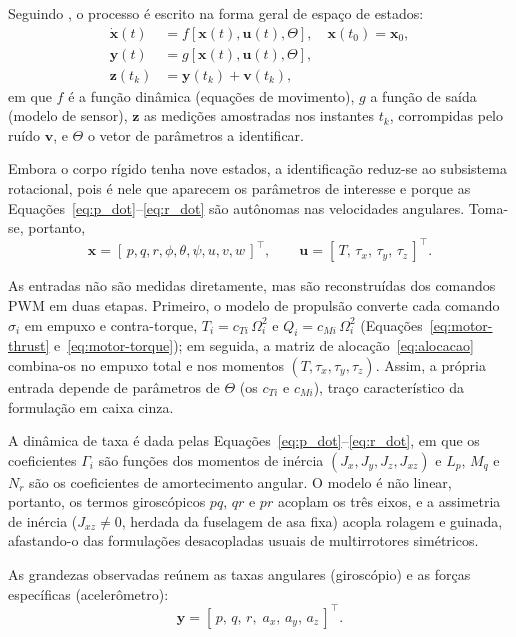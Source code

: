 Seguindo \textcite{Jategaonkar2015}, o processo é escrito na forma geral de espaço de estados:
\begin{align}
\dot{\mathbf{x}}(t) &= f[\mathbf{x}(t),\mathbf{u}(t),\Theta], \quad \mathbf{x}(t_0)=\mathbf{x}_0, \label{eq:model-fx}\\
\mathbf{y}(t) &= g[\mathbf{x}(t),\mathbf{u}(t),\Theta], \label{eq:model-gy}\\
\mathbf{z}(t_k) &= \mathbf{y}(t_k) + \mathbf{v}(t_k), \label{eq:model-z}
\end{align}
em que $f$ é a função dinâmica (equações de movimento), $g$ a função de saída (modelo de sensor), $\mathbf{z}$ as medições amostradas nos instantes $t_k$, corrompidas pelo ruído $\mathbf{v}$, e $\Theta$ o vetor de parâmetros a identificar.

Embora o corpo rígido tenha nove estados, a identificação reduz-se ao subsistema rotacional, pois é nele que aparecem os parâmetros de interesse e porque as Equações~\eqref{eq:p_dot}--\eqref{eq:r_dot} são autônomas nas velocidades angulares. Toma-se, portanto,
\begin{equation}
\mathbf{x}=[\,p,q,r,\phi,\theta,\psi,u,v,w\,]^{\top}, \qquad \mathbf{u}=[\,T,\,\tau_x,\,\tau_y,\,\tau_z\,]^{\top}.
\label{eq:model-xu}
\end{equation}

As entradas não são medidas diretamente, mas são reconstruídas dos comandos PWM em duas etapas. Primeiro, o modelo de propulsão converte cada comando $\sigma_i$ em empuxo e contra-torque, ${T_i=c_{Ti}\,\Omega_i^{2}}$ e ${Q_i=c_{Mi}\,\Omega_i^{2}}$ (Equações~\eqref{eq:motor-thrust} e~\eqref{eq:motor-torque}); em seguida, a matriz de alocação~\eqref{eq:alocacao} combina-os no empuxo total e nos momentos $(T,\tau_x,\tau_y,\tau_z)$. Assim, a própria entrada depende de parâmetros de $\Theta$ (os $c_{Ti}$ e $c_{Mi}$), traço característico da formulação em caixa cinza.

A dinâmica de taxa é dada pelas Equações~\eqref{eq:p_dot}--\eqref{eq:r_dot}, em que os coeficientes $\Gamma_i$ são funções dos momentos de inércia $(J_x,J_y,J_z,J_{xz})$ e $L_p$, $M_q$ e $N_r$ são os coeficientes de amortecimento angular. O modelo é não linear, portanto, os termos giroscópicos $pq$, $qr$ e $pr$ acoplam os três eixos, e a assimetria de inércia ($J_{xz}\neq 0$, herdada da fuselagem de asa fixa) acopla rolagem e guinada, afastando-o das formulações desacopladas usuais de multirrotores simétricos.


As grandezas observadas reúnem as taxas angulares (giroscópio) e as forças específicas (acelerômetro):
\begin{equation}
\mathbf{y}=[\,p,\,q,\,r,\;a_x,\,a_y,\,a_z\,]^{\top}.
\label{eq:model-y}
\end{equation}

